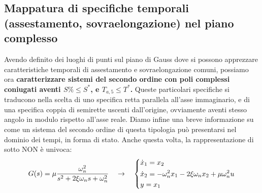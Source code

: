 \subsection{Mappatura di specifiche temporali (assestamento, sovraelongazione) nel piano complesso}
Avendo definito dei luoghi di punti sul piano di Gauss dove si possono apprezzare caratteristiche temporali di assestamento e sovraelongazione comuni, possiamo ora \textbf{caratterizzare sistemi del secondo ordine con poli complessi coniugati aventi $S\% \leq S^*$, e $T_{a,5} \leq T^*$.} Queste particolari specifiche 
si traducono nella scelta di uno specifica retta parallela all'asse immaginario, e di una specifica coppia di semirette uscenti dall'origine, ovviamente aventi stesso angolo in modulo rispetto all'asse reale.
\bb
Diamo infine una breve informazione su come un sistema del secondo ordine di questa tipologia può presentarsi nel dominio dei tempi, in forma di stato. Anche questa volta, la rappresentazione di sotto NON è univoca:
\begin{equation*}
G(s) = \mu \frac{\omega_n^2}{s^2+2\xi\omega_n s + \omega_n^2} \quad \rightarrow \quad \begin{dcases}
\dot x_1 = x_2 \\
\dot x_2 = -\omega_n^2 x_1-2\xi\omega_n x_2 + \mu\omega_n^2 u \\
y = x_1
\end{dcases}
\end{equation*}

